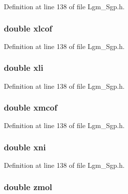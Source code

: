 Definition at line 138 of file Lgm\_\-Sgp.h.\hypertarget{struct___sgp_info_0af92c37e7066a1cb310fb71c91ad369}{
\subsubsection[{xlcof}]{\setlength{\rightskip}{0pt plus 5cm}double {\bf xlcof}}}
\label{struct___sgp_info_0af92c37e7066a1cb310fb71c91ad369}




Definition at line 138 of file Lgm\_\-Sgp.h.\hypertarget{struct___sgp_info_83e99efa0cbc63cd4bad3b0bff321c80}{
\subsubsection[{xli}]{\setlength{\rightskip}{0pt plus 5cm}double {\bf xli}}}
\label{struct___sgp_info_83e99efa0cbc63cd4bad3b0bff321c80}




Definition at line 138 of file Lgm\_\-Sgp.h.\hypertarget{struct___sgp_info_f47d9394629b013547ccd3a29072de44}{
\subsubsection[{xmcof}]{\setlength{\rightskip}{0pt plus 5cm}double {\bf xmcof}}}
\label{struct___sgp_info_f47d9394629b013547ccd3a29072de44}




Definition at line 138 of file Lgm\_\-Sgp.h.\hypertarget{struct___sgp_info_cfea2ed90198863a579d0dd9123d2e7b}{
\subsubsection[{xni}]{\setlength{\rightskip}{0pt plus 5cm}double {\bf xni}}}
\label{struct___sgp_info_cfea2ed90198863a579d0dd9123d2e7b}




Definition at line 138 of file Lgm\_\-Sgp.h.\hypertarget{struct___sgp_info_0c8d59633bdce5d61494b16c884903bd}{
\subsubsection[{zmol}]{\setlength{\rightskip}{0pt plus 5cm}double {\bf zmol}}}
\label{struct___sgp_info_0c8d59633bdce5d61494b16c884903bd}




